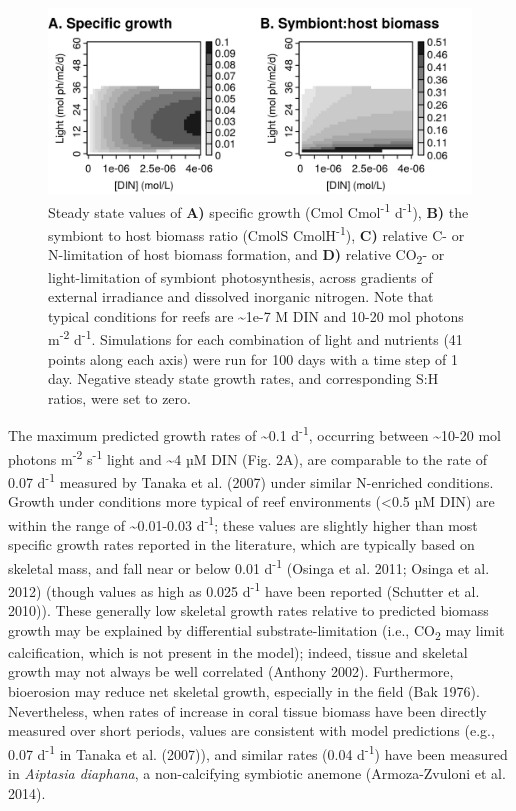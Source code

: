 \documentclass[]{elsarticle} %
\makeatletter
\def\maxwidth{\ifdim\Gin@nat@width>\linewidth\linewidth
\else\Gin@nat@width\fi}
\let\Oldincludegraphics\includegraphics
\renewcommand{\includegraphics}[1]{\Oldincludegraphics[width=\maxwidth]{#1}}
\makeatother
\begin{document}
\begin{figure}[htbp]
\centering
\includegraphics{../img/Fig2.png}
\caption{Steady state values of \textbf{A)} specific growth (Cmol
Cmol\textsuperscript{-1} d\textsuperscript{-1}), \textbf{B)} the
symbiont to host biomass ratio (CmolS CmolH\textsuperscript{-1}),
\textbf{C)} relative C- or N-limitation of host biomass formation, and
\textbf{D)} relative CO\textsubscript{2}- or light-limitation of
symbiont photosynthesis, across gradients of external irradiance and
dissolved inorganic nitrogen. Note that typical conditions for reefs are
\textasciitilde{}1e-7 M DIN and 10-20 mol photons m\textsuperscript{-2}
d\textsuperscript{-1}. Simulations for each combination of light and
nutrients (41 points along each axis) were run for 100 days with a time
step of 1 day. Negative steady state growth rates, and corresponding S:H
ratios, were set to zero.}
\end{figure}

The maximum predicted growth rates of \textasciitilde{}0.1
d\textsuperscript{-1}, occurring between \textasciitilde{}10-20 mol
photons m\textsuperscript{-2} s\textsuperscript{-1} light and
\textasciitilde{}4 µM DIN (Fig. 2A), are comparable to the rate of 0.07
d\textsuperscript{-1} measured by Tanaka et al. (2007) under similar
N-enriched conditions. Growth under conditions more typical of reef
environments (\textless{}0.5 µM DIN) are within the range of
\textasciitilde{}0.01-0.03 d\textsuperscript{-1}; these values are
slightly higher than most specific growth rates reported in the
literature, which are typically based on skeletal mass, and fall near or
below 0.01 d\textsuperscript{-1} (Osinga et al. 2011; Osinga et al.
2012) (though values as high as 0.025 d\textsuperscript{-1} have been
reported (Schutter et al. 2010)). These generally low skeletal growth
rates relative to predicted biomass growth may be explained by
differential substrate-limitation (i.e., CO\textsubscript{2} may limit
calcification, which is not present in the model); indeed, tissue and
skeletal growth may not always be well correlated (Anthony 2002).
Furthermore, bioerosion may reduce net skeletal growth, especially in
the field (Bak 1976). Nevertheless, when rates of increase in coral
tissue biomass have been directly measured over short periods, values
are consistent with model predictions (e.g., 0.07 d\textsuperscript{-1}
in Tanaka et al. (2007)), and similar rates (0.04 d\textsuperscript{-1})
have been measured in \emph{Aiptasia diaphana}, a non-calcifying
symbiotic anemone (Armoza-Zvuloni et al. 2014).
\end{document}
